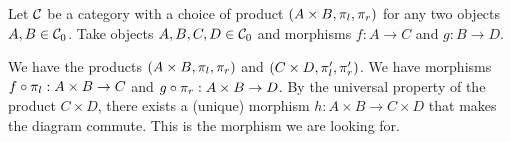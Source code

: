 \begin{solution}\label{sol:product_of_morphisms}
	Let $\mathcal{C}$ be a category with a choice of product $(A\times B, \pi_l, \pi_r)$ for any two objects $A,B\in {\mathcal{C}}_0$. Take objects $ A, B, C, D \in {\mathcal{C}}_0 $ and morphisms $ f: A \to C $ and $ g: B \to D $.

	\begin{center}
	\end{center}

	We have the products $ (A \times B, \pi_l, \pi_r) $ and $ (C \times D, \pi_l^\prime, \pi_r^\prime) $. We have morphisms $ f \circ \pi_l: A \times B \to C $ and $ g \circ \pi_r: A \times B \to D $. By the universal property of the product $ C \times D $, there exists a (unique) morphism $ h: A \times B \to C \times D $ that makes the diagram commute. This is the morphism we are looking for.
\end{solution}


